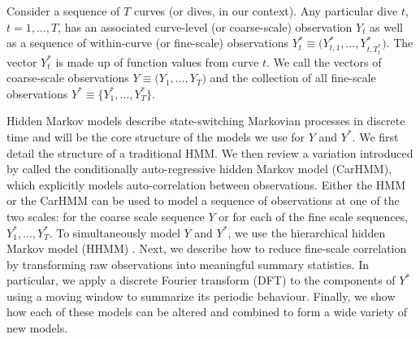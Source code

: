 
Consider a sequence of $T$ curves (or dives, in our context). Any particular dive $t$, $t = 1,
\ldots,T$, has an associated curve-level (or coarse-scale) observation $Y_t$ as well as a sequence of within-curve (or fine-scale) observations $Y^*_{t} \equiv \Big(Y^*_{t,1},\ldots,Y^*_{t,T^*_t}\Big)$. The vector $Y^*_{t}$ is made up of function values from curve $t$. We call the vectors of coarse-scale observations $Y \equiv \Big(Y_1, \ldots, Y_T\Big)$ and the collection of all fine-scale observations $Y^* \equiv \Big\{Y^*_1,\ldots,Y^*_T \Big\}$.

Hidden Markov models describe state-switching Markovian processes in discrete time and will be the core structure of the models we use for $Y$ and $Y^*$. %
We first detail the structure of a traditional HMM. We then review a variation introduced by \cite{Lawler:2019} called the conditionally auto-regressive hidden Markov model (CarHMM), which explicitly models auto-correlation between observations. Either the HMM or the CarHMM can be used to model a sequence of observations at one of the two scales: for the coarse scale sequence $Y$ or for each of the fine scale sequences, $Y_1^*,\ldots, Y_T^*$. To simultaneously model $Y$ and $Y^*$, we use the hierarchical hidden Markov model (HHMM) \citep{Barajas:2017,Adam:2019}.
Next, we describe how to reduce fine-scale correlation by transforming raw observations into meaningful summary statistics. In particular, we apply a discrete Fourier transform (DFT) to the components of $Y^*$ using a moving window to summarize its periodic behaviour. Finally, we show how each of these models can be altered and combined to form a wide variety of new models.

